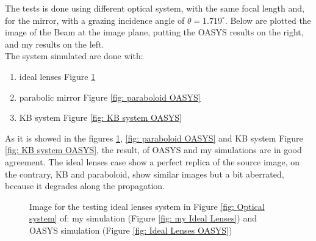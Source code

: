 %
The tests is done using different optical system, with the same focal length and, for the mirror, with a grazing incidence angle of $\theta = 1.719^{\circ}$. Below are plotted the image of the Beam at the image plane, putting the OASYS results on the right, and my results on the left. 
\\
The system simulated are done with:
\begin{enumerate}
\item ideal lenses Figure \ref{fig: Ideal lense OASYS}
\item parabolic mirror Figure \ref{fig: paraboloid OASYS}
\item KB system Figure \ref{fig: KB system OASYS}
\end{enumerate} 
\noindent As it is showed in the figures \ref{fig: Ideal lense OASYS}, \ref{fig: paraboloid OASYS} and KB system Figure \ref{fig: KB system OASYS}, the result, of OASYS and my simulations are in good agreement. The ideal lenses case show a perfect replica of the source image, on the contrary, KB and paraboloid, show similar images but a bit aberrated, because it degrades along the propagation.
\newpage
%
\begin{figure}[H]
%
\centering
%
%
%
\caption{Image for the testing ideal lenses system in Figure \ref{fig: Optical system} of: my simulation (Figure \ref{fig: my Ideal Lenses}) and OASYS simulation (Figure \ref{fig: Ideal Lenses OASYS})}
%
\label{fig: Ideal lense OASYS}
%
\end{figure}
%
